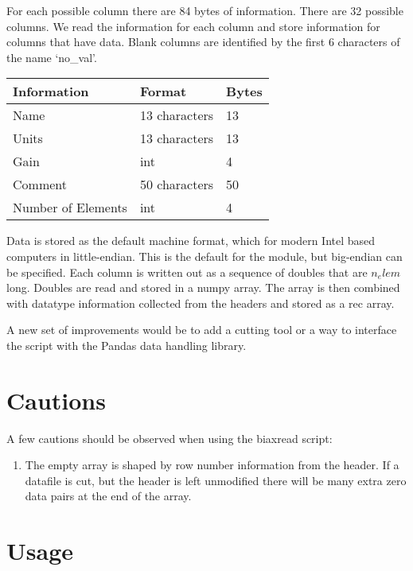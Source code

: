 \documentclass[a4paper,11pt,oneside]{article}
\begin{document}
For each possible column there are 84 bytes of information.  There are 32 possible columns.  We read the information for each column and store information for columns that have data.  Blank columns are identified by the first 6 characters of the name `no\_val'.  

\begin{table}[h]
	\begin{center}
	\begin{tabular}{| l | l | l |}
		\hline
                  \rowcolor[gray]{.85}
		Information & Format & Bytes\\
		\hline
		Name & 13 characters &  13\\
		\hline
		Units & 13 characters &  13 \\
		\hline
		Gain & int & 4\\
		\hline
		Comment & 50 characters & 50\\
		\hline
		Number of Elements & int & 4\\
		\hline
	\end{tabular}
	\end{center}
	\label{BinaryColHeadFormat}
\end{table}

Data is stored as the default machine format, which for modern Intel based computers in little-endian.  This is the default for the module, but big-endian can be specified.  Each column is written out as a sequence of doubles that are $n_elem$ long.  Doubles are read and stored in a numpy array.  The array is then combined with datatype information collected from the headers and stored as a rec array.

A new set of improvements would be to add a cutting tool or a way to interface the script with the Pandas data handling library.

\section{Cautions}
A few cautions should be observed when using the biaxread script:

\begin{enumerate}
\item The empty array is shaped by row number information from the header.  If a datafile is cut, but the header is left unmodified there will be many extra zero data pairs at the end of the array.
\end{enumerate}

\section{Usage}
\end{document}
